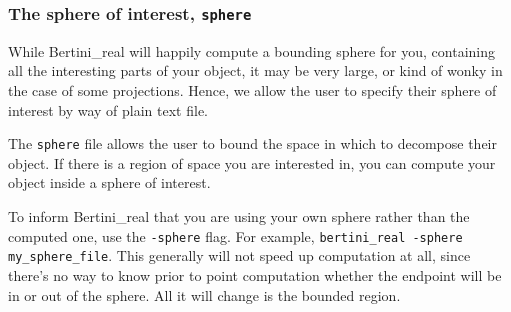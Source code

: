 \subsubsection{The sphere of interest, \texttt{sphere}}
\label{sec:sphere}

While Bertini\_real will happily compute a bounding sphere for you, containing all the interesting parts of your object, it may be very large, or kind of wonky in the case of some projections.  Hence, we allow the user to specify their sphere of interest by way of plain text file.

The {\tt sphere} file allows the user to bound the space in which to decompose their object.
If there is a region of space you are interested in, you can compute your object inside a sphere of interest.

To inform Bertini\_real that you are using your own sphere rather than the computed one, use the {\tt -sphere} flag.  For example, {\tt bertini\_real -sphere my\_sphere\_file}.  This generally will not speed up computation at all, since there's no way to know prior to point computation whether the endpoint will be in or out of the sphere.  All it will change is the bounded region.


